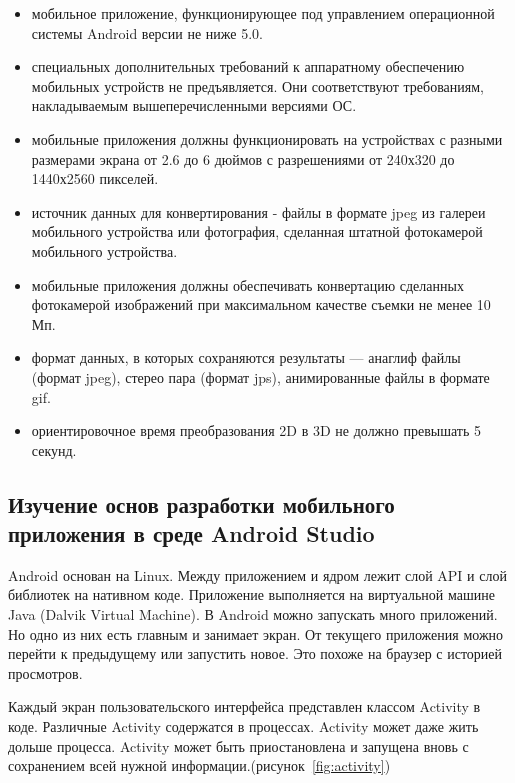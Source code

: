 \begin{itemize}
	\item мобильное приложение, функционирующее под управлением операционной системы Android версии не ниже 5.0.
	\item специальных дополнительных требований к аппаратному обеспечению мобильных устройств не предъявляется. Они соответствуют требованиям, накладываемым вышеперечисленными версиями ОС.
	\item мобильные приложения должны функционировать на устройствах с разными размерами экрана от 2.6 до 6 дюймов с разрешениями от 240х320 до 1440х2560 пикселей.
	\item источник данных для конвертирования - файлы в формате jpeg из галереи мобильного устройства или фотография, сделанная штатной фотокамерой мобильного устройства.
	\item мобильные приложения должны обеспечивать конвертацию сделанных фотокамерой изображений при максимальном качестве съемки не менее 10 Мп.
	\item формат данных, в которых сохраняются результаты --- анаглиф файлы (формат jpeg), стерео пара (формат jps), анимированные файлы в формате gif.
	\item ориентировочное время преобразования 2D в 3D не должно превышать 5 секунд.
\end{itemize}

\subsection{Изучение основ разработки мобильного приложения в среде Android Studio}

Android основан на Linux. Между приложением и ядром лежит слой API и слой библиотек на нативном коде. Приложение выполняется на виртуальной машине Java (Dalvik Virtual Machine).
В Android можно запускать много приложений. Но одно из них есть главным и занимает экран. От текущего приложения можно перейти к предыдущему или запустить новое. Это похоже на браузер с историей просмотров.

Каждый экран пользовательского интерфейса представлен классом Activity в коде. Различные Activity содержатся в процессах. Activity может даже жить дольше процесса. Activity может быть приостановлена и запущена вновь с сохранением всей нужной информации.(рисунок~\ref{fig:activity})

